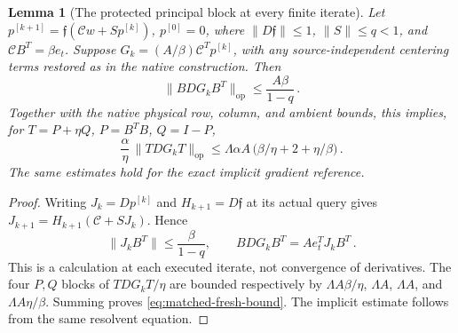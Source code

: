 \documentclass[11pt]{article}
\numberwithin{equation}{section}
\newtheorem{lemma}[theorem]{Lemma}\newtheorem{corollary}[theorem]{Corollary}
\theoremstyle{remark}\newtheorem{remark}[theorem]{Remark}
\newcommand{\op}{\mathrm{op}}\newcommand{\LL}{\Lambda}
\newcommand{\norm}[1]{\lVert#1\rVert}
\begin{document}
\begin{lemma}[The protected principal block at every finite iterate]
\label{lem:protected-principal-block}
Let $p^{[k+1]}=\mathfrak f(\mathcal Cw+Sp^{[k]})$, $p^{[0]}=0$,
where $\norm{D\mathfrak f}\le1$, $\norm S\le q<1$, and
$\mathcal C B^T=\beta e_t$. Suppose
$G_k=(A/\beta)\mathcal C^Tp^{[k]}$, with any source-independent
centering terms restored as in the native construction. Then
\[
 \norm{BDG_kB^T}_{\op}\le\frac{A\beta}{1-q}\,.
\]
Together with the native physical row, column, and ambient bounds,
this implies, for $T=P+\eta Q$, $P=B^TB$, $Q=I-P$,
\begin{equation}\label{eq:matched-fresh-bound}
 \frac\alpha\eta\,\norm{T DG_k T}_{\op}
 \le\LL\alpha A\,\bigl(\beta/\eta+2+\eta/\beta\bigr)\,.
\end{equation}
The same estimates hold for the exact implicit gradient reference.
\end{lemma}
\begin{proof}
Writing $J_k=Dp^{[k]}$ and $H_{k+1}=D\mathfrak f$ at its actual
query gives $J_{k+1}=H_{k+1}(\mathcal C+SJ_k)$. Hence
\[
 \norm{J_kB^T}\le\frac\beta{1-q},\qquad
 BDG_kB^T=A e_t^TJ_kB^T\,.
\]
This is a calculation at each executed iterate, not convergence of
derivatives. The four $P,Q$ blocks of $T DG_k T/\eta$ are bounded
respectively by $\LL A\beta/\eta$, $\LL A$, $\LL A$,
and $\LL A\eta/\beta$. Summing proves
\eqref{eq:matched-fresh-bound}. The implicit estimate follows from
the same resolvent equation.
\end{proof}
\end{document}
